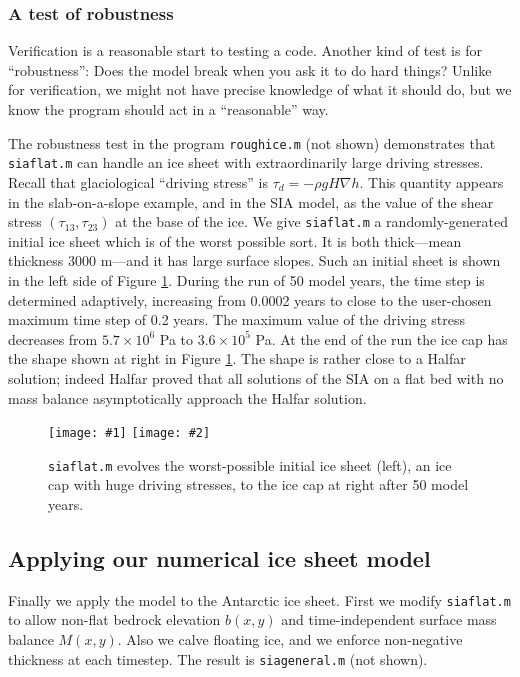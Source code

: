 \documentclass[titlepage,a4paper,final,12pt]{scrartcl}
\newcommand{\grad}{\nabla}
\newcommand{\twofigsizes}[5]{
\begin{figure}[ht]
\centering
\texttt{[image: \#1]} \quad
\texttt{[image: \#2]}
\caption{#3}
\label{fig:#1}
\end{figure}}
\newcommand{\twofig}[3]{\twofigsizes{#1}{#2}{#3}{2.5in}{2.5in}}
\begin{document}
\subsubsection*{A test of robustness}  Verification is a reasonable start to testing a code.  Another kind of test is for ``robustness'': Does the model break when you ask it to do hard things?  Unlike for verification, we might not have precise knowledge of what it should do, but we know the program should act in a ``reasonable'' way.

The robustness test in the program \texttt{roughice.m} (not shown) demonstrates that \texttt{siaflat.m} can handle an ice sheet with extraordinarily large driving stresses.  Recall that glaciological ``driving stress'' is $\tau_d = - \rho g H \grad h$.  This quantity appears in the slab-on-a-slope example, and in the SIA model, as the value of the shear stress $(\tau_{13},\tau_{23})$ at the base of the ice.  We give \texttt{siaflat.m} a randomly-generated initial ice sheet which is of the worst possible sort.  It is both thick---mean thickness 3000 m---and it has large surface slopes.  Such an initial sheet is shown in the left side of Figure \ref{fig:roughinitial}.  During the run of 50 model years, the time step is determined adaptively, increasing from 0.0002 years to close to the user-chosen maximum time step of 0.2 years.  The maximum value of the driving stress decreases from $5.7\times 10^6$ Pa to $3.6\times 10^5$ Pa.  At the end of the run the ice cap has the shape shown at right in Figure \ref{fig:roughinitial}.  The shape is rather close to a Halfar solution; indeed Halfar proved that all solutions of the SIA on a flat bed with no mass balance asymptotically approach the Halfar solution.

\twofig{roughinitial}{roughfinal}{\texttt{siaflat.m} evolves the worst-possible initial ice sheet (left), an ice cap with huge driving stresses, to the ice cap at right after 50 model years.}


\subsection{Applying our numerical ice sheet model}

Finally we apply the model to the Antarctic ice sheet.  First we modify \texttt{siaflat.m} to allow non-flat bedrock elevation $b(x,y)$ and time-independent surface mass balance $M(x,y)$.  Also we calve floating ice, and we enforce non-negative thickness at each timestep.  The result is \texttt{siageneral.m} (not shown).
\end{document}
